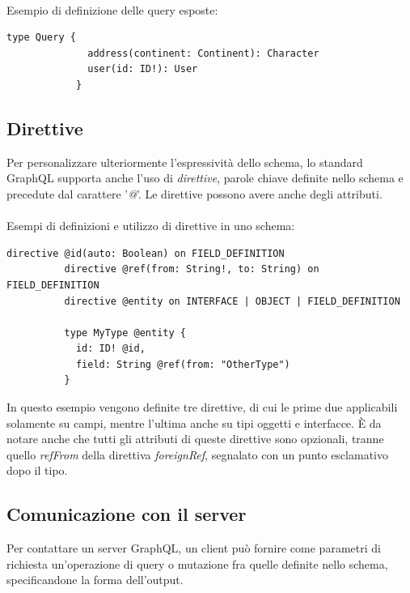 \documentclass[a4paper, 12pt]{report}
\begin{document}
        \paragraph*{}
          Esempio di definizione delle query esposte:
          \begin{Verbatim}[samepage=true]
            type Query {
              address(continent: Continent): Character
              user(id: ID!): User
            }
          \end{Verbatim}
      \subsection{Direttive}
        Per personalizzare ulteriormente l'espressività dello schema, lo standard GraphQL supporta anche l'uso di \emph{direttive}, parole chiave definite nello schema e precedute dal carattere '\emph{@}'. Le direttive possono avere anche degli attributi.
      \paragraph*{}
        Esempi di definizioni e utilizzo di direttive in uno schema:
        \begin{Verbatim}[samepage=true]
          directive @id(auto: Boolean) on FIELD_DEFINITION
          directive @ref(from: String!, to: String) on FIELD_DEFINITION
          directive @entity on INTERFACE | OBJECT | FIELD_DEFINITION

          type MyType @entity {
            id: ID! @id,
            field: String @ref(from: "OtherType") 
          }
        \end{Verbatim}
        In questo esempio vengono definite tre direttive, di cui le prime due applicabili solamente su campi, mentre l'ultima anche su tipi oggetti e interfacce.
        È da notare anche che tutti gli attributi di queste direttive sono opzionali, tranne quello \emph{refFrom} della direttiva \emph{foreignRef}, segnalato con un punto esclamativo dopo il tipo.
      \subsection{Comunicazione con il server}
        Per contattare un server GraphQL, un client può fornire come parametri di richiesta un'operazione di query o mutazione fra quelle definite nello schema, specificandone la forma dell'output.
\end{document}
